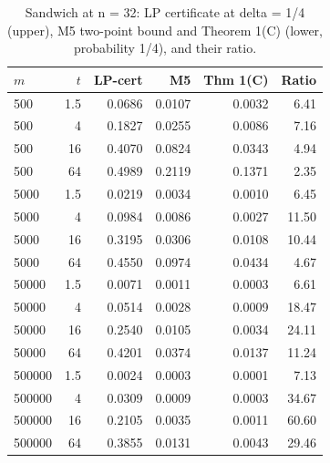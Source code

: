 \begin{table}[t]
\centering
\small
\begin{tabular}{lrrrrr}
\toprule
$m$ & $t$ & LP-cert & M5 & Thm 1(C) & Ratio \\
\midrule
500 & 1.5 & 0.0686 & 0.0107 & 0.0032 & 6.41 \\
500 & 4 & 0.1827 & 0.0255 & 0.0086 & 7.16 \\
500 & 16 & 0.4070 & 0.0824 & 0.0343 & 4.94 \\
500 & 64 & 0.4989 & 0.2119 & 0.1371 & 2.35 \\
5000 & 1.5 & 0.0219 & 0.0034 & 0.0010 & 6.45 \\
5000 & 4 & 0.0984 & 0.0086 & 0.0027 & 11.50 \\
5000 & 16 & 0.3195 & 0.0306 & 0.0108 & 10.44 \\
5000 & 64 & 0.4550 & 0.0974 & 0.0434 & 4.67 \\
50000 & 1.5 & 0.0071 & 0.0011 & 0.0003 & 6.61 \\
50000 & 4 & 0.0514 & 0.0028 & 0.0009 & 18.47 \\
50000 & 16 & 0.2540 & 0.0105 & 0.0034 & 24.11 \\
50000 & 64 & 0.4201 & 0.0374 & 0.0137 & 11.24 \\
500000 & 1.5 & 0.0024 & 0.0003 & 0.0001 & 7.13 \\
500000 & 4 & 0.0309 & 0.0009 & 0.0003 & 34.67 \\
500000 & 16 & 0.2105 & 0.0035 & 0.0011 & 60.60 \\
500000 & 64 & 0.3855 & 0.0131 & 0.0043 & 29.46 \\
\bottomrule
\end{tabular}
\caption{Sandwich at n = 32: LP certificate at delta = 1/4 (upper), M5 two-point bound and Theorem 1(C) (lower, probability 1/4), and their ratio.}
\label{tab:T5a_sandwich}
\end{table}
